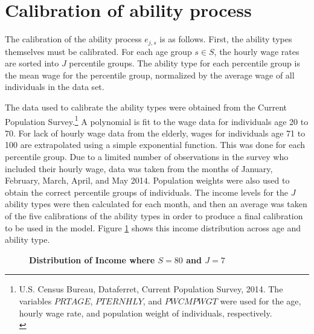 \documentclass[letterpaper,12pt]{article}
\theoremstyle{definition}
\begin{document}
\newpage
\section{Calibration of ability process}\label{AppAbilCalib}

  \setcounter{equation}{0}

  The calibration of the ability process $e_{j,s}$ is as follows.  First, the ability types themselves must be calibrated. For each age group $s \in S$, the hourly wage rates are sorted into $J$ percentile groups.  The ability type for each percentile group is the mean wage for the percentile group, normalized by the average wage of all individuals in the data set.

  The data used to calibrate the ability types were obtained from the Current Population Survey.\footnote{U.S. Census Bureau, Dataferret, Current Population Survey, 2014. The variables $PRTAGE$, $PTERNHLY$, and $PWCMPWGT$ were used for the age, hourly wage rate, and population weight of individuals, respectively. \\ [-2pt]} A polynomial is fit to the wage data for individuals age 20 to 70.  For lack of hourly wage data from the elderly, wages for individuals age 71 to 100 are extrapolated using a simple exponential function. This was done for each percentile group.  Due to a limited number of observations in the survey who included their hourly wage, data was taken from the months of January, February, March, April, and May 2014.  Population weights were also used to obtain the correct percentile groups of individuals.  The income levels for the $J$ ability types were then calculated for each month, and then an average was taken of the five calibrations of the ability types in order to produce a final calibration to be used in the model. Figure \ref{FigIncome} shows this income distribution across age and ability type.

    \begin{figure}[htb]\centering \captionsetup{width=4.0in}
      \caption{\label{FigIncome}\textbf{Distribution of Income where $S=80$ and $J=7$}}
    \end{figure}
\end{document}
